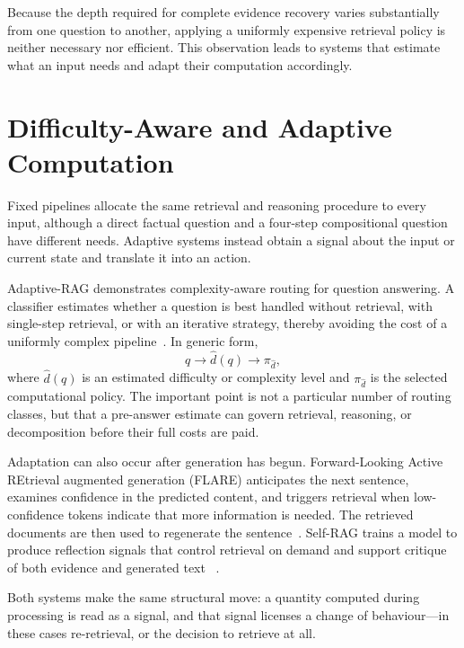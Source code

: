 Because the depth required for complete evidence recovery varies substantially
from one question to another, applying a uniformly expensive retrieval policy is
neither necessary nor efficient. This observation leads to systems that estimate
what an input needs and adapt their computation accordingly.

\section{Difficulty-Aware and Adaptive Computation}
\label{sec:adaptive-computation}

Fixed pipelines allocate the same retrieval and reasoning procedure to every
input, although a direct factual question and a four-step compositional question
have different needs. Adaptive systems instead obtain a signal about the input
or current state and translate it into an action.

Adaptive-RAG demonstrates complexity-aware routing for question answering. A
classifier estimates whether a question is best handled without retrieval, with
single-step retrieval, or with an iterative strategy, thereby avoiding the cost
of a uniformly complex pipeline~\cite{jeong2024adaptiverag}. In generic form,
\begin{equation}
  q\longrightarrow\widehat{d}(q)\longrightarrow\pi_{\widehat{d}},
  \label{eq:difficulty-routing}
\end{equation}
where \(\widehat{d}(q)\) is an estimated difficulty or complexity level and
\(\pi_{\widehat{d}}\) is the selected computational policy. The important point
is not a particular number of routing classes, but that a pre-answer estimate
can govern retrieval, reasoning, or decomposition before their full costs are
paid.

Adaptation can also occur after generation has begun. Forward-Looking Active
REtrieval augmented generation (FLARE) anticipates the next sentence, examines
confidence in the predicted content, and triggers retrieval
when low-confidence tokens indicate that more information is needed. The
retrieved documents are then used to regenerate the sentence~\cite{jiang2023flare}.
Self-RAG trains a model to produce reflection signals that control retrieval on
demand and support critique of both evidence and generated text
~\cite{asai2023selfrag}.

Both systems make the same structural move: a quantity computed during
processing is read as a signal, and that signal licenses a change of
behaviour---in these cases re-retrieval, or the decision to retrieve at all.


